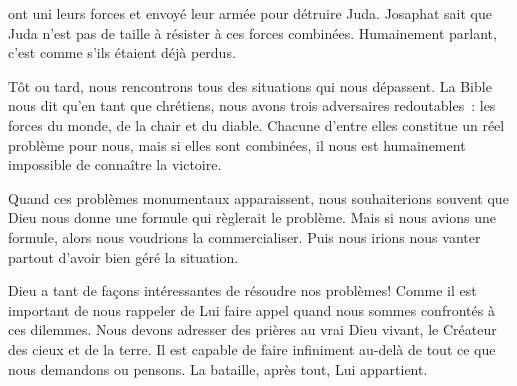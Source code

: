 

 ont uni leurs forces et envoyé
 leur armée pour détruire Juda. Josaphat sait que Juda n'est pas de taille
 à résister à ces forces combinées.
 Humainement parlant, c'est comme s'ils étaient déjà perdus. 

Tôt ou tard, nous rencontrons tous des situations qui nous dépassent.
 La Bible nous dit qu'en tant que chrétiens,
 nous avons trois adversaires redoutables~: les forces du monde,
 de la chair et du diable. Chacune d'entre elles constitue un réel problème
 pour nous, mais si elles sont combinées, il nous est humainement impossible
 de connaître la victoire. 


Quand ces problèmes monumentaux apparaissent, nous souhaiterions souvent
 que Dieu nous donne une formule qui règlerait le problème.
 Mais si nous avions une formule, alors nous voudrions la commercialiser.
 Puis nous irions nous vanter partout d'avoir bien géré la situation. 

Dieu a tant de façons intéressantes de résoudre nos problèmes!
 Comme il est important de nous rappeler de Lui faire appel quand nous sommes
 confrontés à ces dilemmes. Nous devons adresser des prières
 au vrai Dieu vivant, le Créateur des cieux et de la terre.
 Il est capable de faire infiniment au-delà de tout ce que nous demandons
 ou pensons. La bataille, après tout, Lui appartient. 

\dvrule






